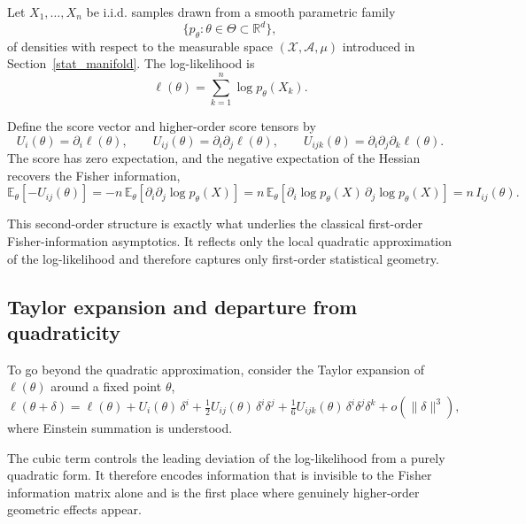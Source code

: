 \documentclass[11pt,letterpaper]{amsart}
\numberwithin{equation}{section}
\theoremstyle{plain}
\theoremstyle{definition}
\theoremstyle{remark}
\begin{document}
Let \(X_1,\dots,X_n\) be i.i.d. samples drawn from a smooth parametric family
\[
\{p_\theta:\theta\in\Theta\subset\mathbb{R}^d\},
\]
of densities with respect to the measurable space \((\mathcal X,\mathcal A,\mu)\) introduced in Section~\ref{stat_manifold}. The log-likelihood is
\begin{equation*}
\ell(\theta)=\sum_{k=1}^n \log p_\theta(X_k).
\end{equation*}

Define the score vector and higher-order score tensors by
\begin{equation*}
U_i(\theta)=\partial_i \ell(\theta),
\qquad
U_{ij}(\theta)=\partial_i\partial_j \ell(\theta),
\qquad
U_{ijk}(\theta)=\partial_i\partial_j\partial_k \ell(\theta).
\end{equation*}
The score has zero expectation, and the negative expectation of the Hessian recovers the Fisher information,
\begin{equation*}
\mathbb{E}_\theta[-U_{ij}(\theta)]
=
-n\,\mathbb{E}_\theta[\partial_i\partial_j \log p_\theta(X)]
=
n\,\mathbb{E}_\theta[\partial_i\log p_\theta(X)\,\partial_j\log p_\theta(X)]
=
n\,I_{ij}(\theta).
\end{equation*}

This second-order structure is exactly what underlies the classical first-order Fisher-information asymptotics. It reflects only the local quadratic approximation of the log-likelihood and therefore captures only first-order statistical geometry.


\subsection{Taylor expansion and departure from quadraticity}

To go beyond the quadratic approximation, consider the Taylor expansion of \(\ell(\theta)\) around a fixed point \(\theta\),
\begin{equation*}
\ell(\theta+\delta)
=
\ell(\theta)
+
U_i(\theta)\,\delta^i
+
\tfrac12 U_{ij}(\theta)\,\delta^i\delta^j
+
\tfrac16 U_{ijk}(\theta)\,\delta^i\delta^j\delta^k
+
o(\|\delta\|^3),
\end{equation*}
where Einstein summation is understood.

The cubic term controls the leading deviation of the log-likelihood from a purely quadratic form. It therefore encodes information that is invisible to the Fisher information matrix alone and is the first place where genuinely higher-order geometric effects appear.
\end{document}
